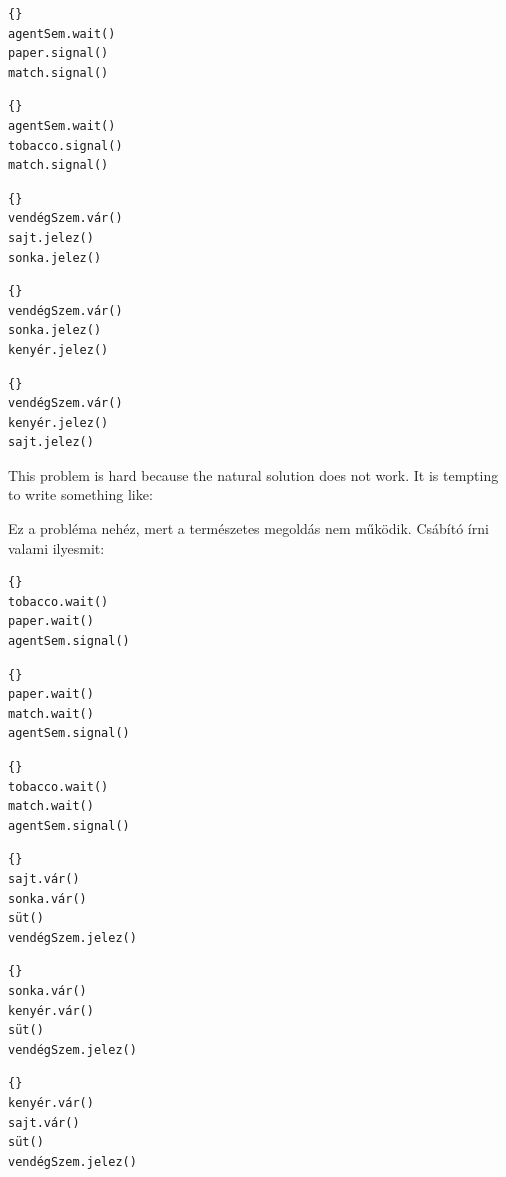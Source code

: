 \documentclass{book}
\begin{document}
\begin{lstlisting}[title={Agent B code}]{}
agentSem.wait()
paper.signal()
match.signal()
\end{lstlisting}

\begin{lstlisting}[title={Agent C code}]{}
agentSem.wait()
tobacco.signal()
match.signal()
\end{lstlisting}

\begin{lstlisting}[title={SaSo vendég kód}]{}
vendégSzem.vár()
sajt.jelez()
sonka.jelez()
\end{lstlisting}

\begin{lstlisting}[title={SoKe vendég kód}]{}
vendégSzem.vár()
sonka.jelez()
kenyér.jelez()
\end{lstlisting}

\begin{lstlisting}[title={KeSa vendég kód}]{}
vendégSzem.vár()
kenyér.jelez()
sajt.jelez()
\end{lstlisting}

This problem is hard because the natural solution does not
work.  It is tempting to write something like:

Ez a probléma nehéz, mert a természetes megoldás nem működik.
Csábító írni valami ilyesmit:

\begin{lstlisting}[title={Smoker with matches}]{}
tobacco.wait()
paper.wait()
agentSem.signal()
\end{lstlisting}

\begin{lstlisting}[title={Smoker with tobacco}]{}
paper.wait()
match.wait()
agentSem.signal()
\end{lstlisting}

\begin{lstlisting}[title={Smoker with paper}]{}
tobacco.wait()
match.wait()
agentSem.signal()
\end{lstlisting}

\begin{lstlisting}[title={Kenyeres háziasszony}]{}
sajt.vár()
sonka.vár()
süt()
vendégSzem.jelez()
\end{lstlisting}

\begin{lstlisting}[title={Sajtos háziasszony}]{}
sonka.vár()
kenyér.vár()
süt()
vendégSzem.jelez()
\end{lstlisting}

\begin{lstlisting}[title={Sonkás háziasszony}]{}
kenyér.vár()
sajt.vár()
süt()
vendégSzem.jelez()
\end{lstlisting}
\end{document}

